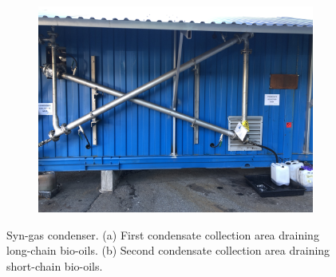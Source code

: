 \begin{figure}
        \centering
         \begin{subfigure}[t]{\linewidth}
         \centering
         \includegraphics[width=0.74\linewidth,scale=0.74]{Bilder/Pyrolysis/Condenser.png}
         \caption{}
         \label{fig:condenserfull}
     \end{subfigure}
           \hspace{0.5cm}
        \caption{Syn-gas condenser. (a) First condensate collection area draining long-chain bio-oils. (b) Second condensate collection area draining short-chain bio-oils.}
        \label{fig:condenser}
\end{figure}

